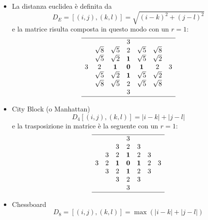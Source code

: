 \documentclass{report}
\newcommand{\abs}[1]{\lvert#1\rvert}
\begin{document}
\begin{itemize}
\item La distanza euclidea è definita da
  \begin{equation}
    \label{eq:propdelimmdig}
    D_E=[(i,j), (k,l)]= \sqrt{(i-k)^2+(j-l)^2}
  \end{equation}
  e la matrice risulta composta in questo modo con un $r=1$:
  \begin{equation*}
    \begin{array}[ht!]{ccccccc}
      \hline
      &&&3&&&\\
      & \sqrt{8} & \sqrt{5} & 2 & \sqrt{5} & \sqrt{8}\\
      & \sqrt{5} & \sqrt{2} & \textbf{1} & \sqrt{5} & \sqrt{2}\\
      3 & 2 & \textbf{1} & \textbf{0} & \textbf{1} & 2 & 3\\
      & \sqrt{5} & \sqrt{2} & \textbf{1} & \sqrt{5} & \sqrt{2}\\
      & \sqrt{8} & \sqrt{5} & 2 & \sqrt{5} & \sqrt{8}\\
      &&&3&&&\\\hline
    \end{array}
  \end{equation*}
\item City Block (o Manhattan)
  \begin{equation}
    \label{eq:cityblock}
    D_4[(i,j), (k,l)]=\abs{i-k}+\abs{j-l}
  \end{equation}
  e la trasposizione in matrice è la seguente con un $r=1$:
    \begin{equation*}
      \begin{array}[ht!]{ccccccc}
        \hline
        &&&3&&&\\
        &&3 & 2 & 3 &&\\
        &3& 2 & \textbf{1} & 2&3& \\
        3 & 2 & \textbf{1} & \textbf{0} & \textbf{1} & 2 & 3\\
        &3& 2 & \textbf{1} & 2&3& \\
        &&3 & 2 & 3 &&\\
        &&&3&&&\\\hline
      \end{array}
    \end{equation*}
\item Chessboard
  \begin{equation}
    \label{eq:chessboard}
    D_8=[(i,j), (k,l)]=\max\left(\abs{i-k}+\abs{j-l}\right)
  \end{equation}

\end{itemize}
\end{document}
